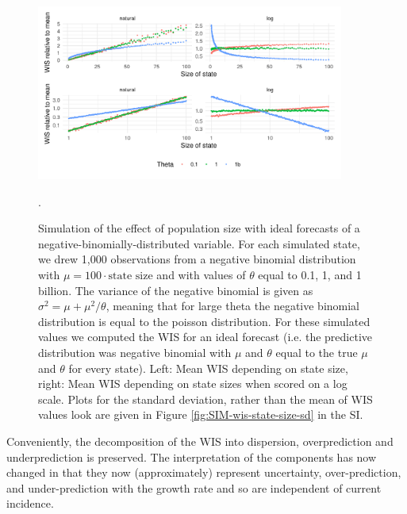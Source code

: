 \documentclass{article}
\begin{document}


\begin{figure}[h!]
    \centering
    \includegraphics[width=0.9\textwidth]{output/figures/SIM-mean-sd-state-size.png}
    \caption{Simulation of the effect of population size with ideal forecasts of a negative-binomially-distributed variable. For each simulated state, we drew 1,000 observations from a negative binomial distribution with $\mu = 100 \cdot \text{state size}$ and with values of $\theta$ equal to 0.1, 1, and 1 billion. The variance of the negative binomial is given as $\sigma^2 = \mu + \mu^2 / \theta$, meaning that for large theta the negative binomial distribution is equal to the poisson distribution. For these simulated values we computed the WIS for an ideal forecast (i.e. the predictive distribution was negative binomial with $\mu$ and $\theta$ equal to the true $\mu$ and $\theta$ for every state). Left: Mean WIS depending on state size, right: Mean WIS depending on state sizes when scored on a log scale. Plots for the standard deviation, rather than the mean of WIS values look are given in Figure \ref{fig:SIM-wis-state-size-sd} in the SI.}. 
    \label{fig:SIM-wis-state-size-mean}
\end{figure}


Conveniently, the decomposition of the WIS into dispersion, overprediction and underprediction is preserved. The interpretation of the components has now changed in that they now (approximately) represent uncertainty, over-prediction, and under-prediction with the growth rate and so are independent of current incidence. 
\end{document}

